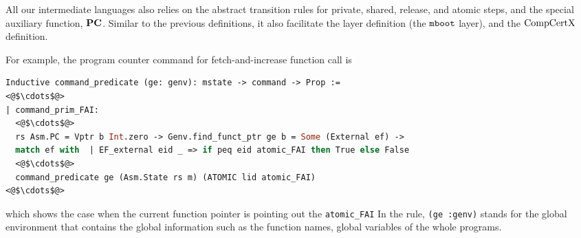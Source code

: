 %

All our intermediate languages 
also relies on the abstract transition rules for 
private, shared, release, and atomic steps, and the special auxiliary function, ${\mathrm{\textbf{PC}}}$.
Similar to the previous definitions, 
it also facilitate the layer definition (the ${\mathrm{\texttt{mboot}}}$ layer), 
and the $\mathrm{CompCertX}$ definition.

For example, the program counter command
for fetch-and-increase function call is
\begin{lstlisting}[language=Caml]
Inductive command_predicate (ge: genv): mstate -> command -> Prop :=
<@$\cdots$@>
| command_prim_FAI:
  <@$\cdots$@>
  rs Asm.PC = Vptr b Int.zero -> Genv.find_funct_ptr ge b = Some (External ef) ->
  match ef with  | EF_external eid _ => if peq eid atomic_FAI then True else False
  <@$\cdots$@>
  command_predicate ge (Asm.State rs m) (ATOMIC lid atomic_FAI)
<@$\cdots$@>
\end{lstlisting}
which shows the case when the current function pointer is pointing out the \lstinline$atomic_FAI$
In the rule, \lstinline$(ge :genv)$ stands for the global environment that contains the 
global information such as the function names, global variables of the whole programs.

